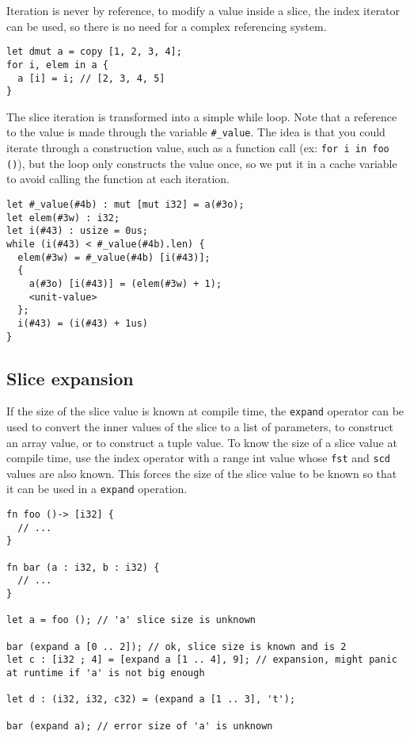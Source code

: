 Iteration is never by reference, to modify a value inside a slice, the index
iterator can be used, so there is no need for a complex referencing system.

\begin{lstlisting}[style=coloredverbatim]
let dmut a = copy [1, 2, 3, 4];
for i, elem in a {
  a [i] = i; // [2, 3, 4, 5]
}
\end{lstlisting}

The slice iteration is transformed into a simple while loop. Note that a
reference to the value is made through the variable \texttt{\#\_value}. The idea
is that you could iterate through a construction value, such as a function call (ex: \texttt{for i in foo ()}),
but the loop only constructs the value once, so we put it in a cache variable to
avoid calling the function at each iteration.

\begin{lstlisting}[style=intermediateVerb]
let #_value(#4b) : mut [mut i32] = a(#3o);
let elem(#3w) : i32;
let i(#43) : usize = 0us;
while (i(#43) < #_value(#4b).len) {
  elem(#3w) = #_value(#4b) [i(#43)];
  {
    a(#3o) [i(#43)] = (elem(#3w) + 1);
    <unit-value>
  };
  i(#43) = (i(#43) + 1us)
}
\end{lstlisting}

\subsection{Slice expansion}

If the size of the slice value is known at compile time, the \texttt{expand}
operator can be used to convert the inner values of the slice to a list of
parameters, to construct an array value, or to construct a tuple value. To know
the size of a slice value at compile time, use the index operator with a range
int value whose \texttt{fst} and \texttt{scd} values are also known. This forces
the size of the slice value to be known so that it can be used in a
\texttt{expand} operation.

\begin{lstlisting}[style=coloredverbatim]
fn foo ()-> [i32] {
  // ...
}

fn bar (a : i32, b : i32) {
  // ...
}

let a = foo (); // 'a' slice size is unknown

bar (expand a [0 .. 2]); // ok, slice size is known and is 2
let c : [i32 ; 4] = [expand a [1 .. 4], 9]; // expansion, might panic at runtime if 'a' is not big enough

let d : (i32, i32, c32) = (expand a [1 .. 3], 't');

bar (expand a); // error size of 'a' is unknown
  \end{lstlisting}

